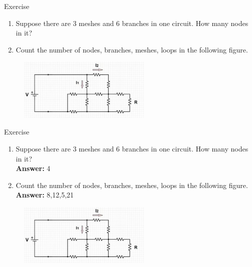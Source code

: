 \documentclass{beamer}
\begin{document}
\begin{frame}{Exercise}
\begin{enumerate}
\item Suppose there are 3 meshes and 6 branches in one circuit. 
\newline
How many nodes in it?
\newline
\item Count the number of nodes, branches, meshes, loops in the following figure.
\end{enumerate}
\begin{figure}
\centering
\includegraphics[width=2.5in]{q2.jpg}
\end{figure}
\end{frame}

\begin{frame}{Exercise}
\begin{enumerate}
\item Suppose there are 3 meshes and 6 branches in one circuit. 
\newline
How many nodes in it?
\\
\textbf{Answer:} 4
\item Count the number of nodes, branches, meshes, loops in the following figure.
\\
\textbf{Answer:} 8,12,5,21
\end{enumerate}
\begin{figure}
\centering
\includegraphics[width=2.5in]{q2.jpg}
\end{figure}
\end{frame}
\end{document}

